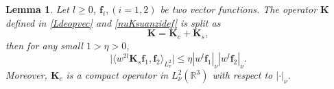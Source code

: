 \documentclass[reqno]{amsart}
\numberwithin{equation}{section}
\numberwithin{equation}{section}
\newtheorem{lema}[thm]{Lemma}
\begin{document}
	\begin{lema}\label{lemma2.2}
		Let $l\geq0$, $\mathbf{f}_i, (i=1,2)$ be two vector functions. The operator $\mathbf{K}$ defined in \eqref{Ldeopvec} and \eqref{nuKsuanzidef} is split as
		\begin{equation*}
				\mathbf{K} = \mathbf{K}_c + \mathbf{K}_s,
		\end{equation*}
		then for any small $1>\eta>0$,
		\begin{equation}\label{Lem222maineqv}
			\big|\big\langle w^{2l}  \mathbf{K}_s \mathbf{f}_1, \mathbf{f}_2 \big\rangle_{L^{2}_{v}}\big| \leq \eta |w^{l}\mathbf{f}_1|_{\nu} |w^{l}\mathbf{f}_2|_{\nu}.
		\end{equation}
		Moreover, $\mathbf{K}_c$ is a compact operator in $L^2_\nu(\mathbb{R}^3)$ with respect to $|\cdot|_\nu$.
	\end{lema}
\end{document}
